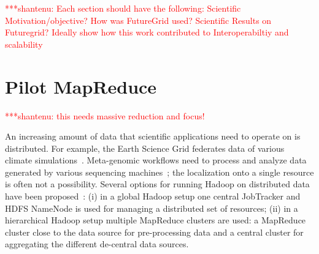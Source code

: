 \documentclass[]{paper}
\newcommand{\jhanote}[1]{ {\textcolor{red} { ***shantenu: #1 }}}
\newcommand{\jhanote}[1]{}
\begin{document}
\jhanote{Each section should have the following: Scientific Motivation/objective? How was FutureGrid used? Scientific Results on Futuregrid? Ideally show how this work contributed to Interoperabiltiy and scalability}

\section{Pilot MapReduce}

\jhanote{this needs massive reduction and focus!}




An increasing amount of data that scientific applications need to operate on is distributed. For example, the Earth Science Grid federates data of various climate simulations~\cite{ESG}. Meta-genomic workflows need to process and analyze data generated by various sequencing machines~\cite{Jha:2011fk}; the localization onto a single resource is often not a possibility.
Several options for running Hadoop on distributed data have been proposed~\cite{weissman-mr-11}: (i) in a global Hadoop setup one central JobTracker and HDFS NameNode is used for managing a distributed set of resources; (ii) in a hierarchical Hadoop setup multiple MapReduce clusters are used: a MapReduce cluster close to the data source for pre-processing data and a central cluster for aggregating the different de-central data sources.
\end{document}
